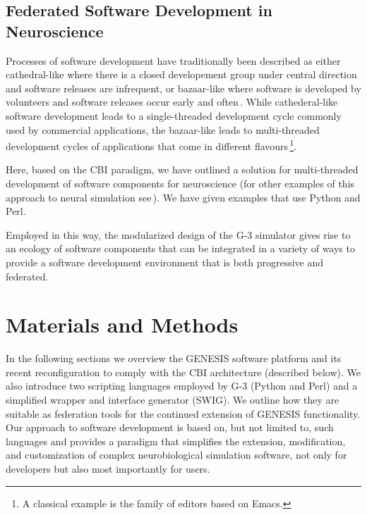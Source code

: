 \documentclass[10pt]{article}
\begin{document}
\subsection*{Federated Software Development in Neuroscience}

Processes of software development have traditionally been described as
either cathedral-like where there is a closed developement group under
central direction and software releases are infrequent, or
bazaar-like where software is developed by
volunteers and software releases occur early and
often\,\cite{raymond01:_cathed_bazaar, citeulike:126678}.
While cathederal-like software development leads to a single-threaded
development cycle commonly used by commercial applications, the
bazaar-like leads to multi-threaded development cycles of
applications that come in different flavours\,\footnote{A classical
  example is the family of editors based on Emacs.}.

Here, based on the CBI paradigm, we have outlined a solution for
multi-threaded development of software components for neuroscience
(for other examples of this approach to neural simulation
see\,\cite{schuermann09:_neuron, nordlie09:_visual}).  We have given
examples that use Python and Perl.

Employed in this way, the modularized design of the G-3 simulator
gives rise to an ecology of software components that can be integrated
in a variety of ways to provide a software development environment
that is both progressive and federated.

\section*{Materials and Methods}

In the following sections we overview the GENESIS software platform
and its recent reconfiguration to comply with the CBI architecture
(described below). We also introduce two scripting languages employed
by G-3 (Python and Perl) and a simplified wrapper and interface
generator (SWIG). We outline how they are suitable as federation tools
for the continued extension of GENESIS functionality. Our approach to
software development is based on, but not limited to, such languages
and provides a paradigm that simplifies the extension, modification,
and customization of complex neurobiological simulation software, not
only for developers but also most importantly for users.
\end{document}

